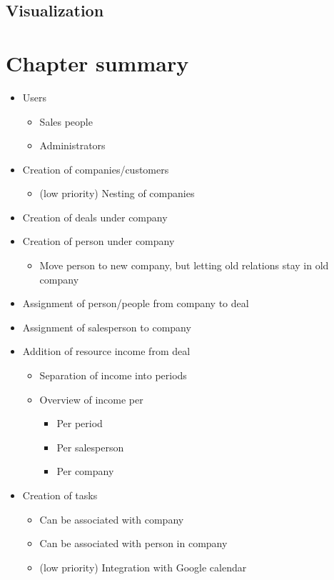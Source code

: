 \subsection{Visualization}
\label{sub:Visualization}


\section{Chapter summary}
\label{sec:Chapter summary}




\begin{itemize}
  \item Users
  \begin{itemize}
    \item Sales people
    \item Administrators
  \end{itemize}
  \item Creation of companies/customers
  \begin{itemize}
    \item (low priority) Nesting of companies
  \end{itemize}
  \item Creation of deals under company
  \item Creation of person under company
  \begin{itemize}
    \item Move person to new company, but letting old relations stay in old company
  \end{itemize}
  \item Assignment of person/people from company to deal
  \item Assignment of salesperson to company
  \item Addition of resource income from deal
  \begin{itemize}
    \item Separation of income into periods
    \item Overview of income per
    \begin{itemize}
      \item Per period
      \item Per salesperson
      \item Per company
    \end{itemize}
  \end{itemize}
  \item Creation of tasks
  \begin{itemize}
    \item Can be associated with company
    \item Can be associated with person in company
    \item (low priority) Integration with Google calendar
  \end{itemize}
\end{itemize}
